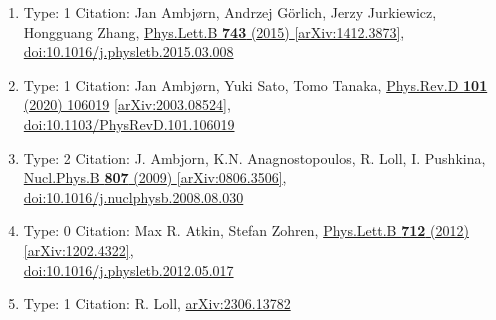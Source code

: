 \documentclass[a4paper,10pt]{article}
\begin{document}
\begin{enumerate}
\begin{enumerate}
  \item Type: 1 Citation: Jan Ambjørn, Andrzej Görlich, Jerzy Jurkiewicz, Hongguang Zhang, \href{https://www.doi.org/10.1016/j.physletb.2015.03.008}{Phys.Lett.B {\bf 743} (2015) }  \href{https://arxiv.org/abs/1412.3873}{[arXiv:1412.3873]},\\\href{https://www.doi.org/10.1016/j.physletb.2015.03.008}{doi:10.1016/j.physletb.2015.03.008}
  \item Type: 1 Citation: Jan Ambjørn, Yuki Sato, Tomo Tanaka, \href{https://www.doi.org/10.1103/PhysRevD.101.106019}{Phys.Rev.D {\bf 101} (2020) 106019}  \href{https://arxiv.org/abs/2003.08524}{[arXiv:2003.08524]},\\\href{https://www.doi.org/10.1103/PhysRevD.101.106019}{doi:10.1103/PhysRevD.101.106019}
  \item Type: 2 Citation: J. Ambjorn, K.N. Anagnostopoulos, R. Loll, I. Pushkina, \href{https://www.doi.org/10.1016/j.nuclphysb.2008.08.030}{Nucl.Phys.B {\bf 807} (2009) }  \href{https://arxiv.org/abs/0806.3506}{[arXiv:0806.3506]},\\\href{https://www.doi.org/10.1016/j.nuclphysb.2008.08.030}{doi:10.1016/j.nuclphysb.2008.08.030}
  \item Type: 0 Citation: Max R. Atkin, Stefan Zohren, \href{https://www.doi.org/10.1016/j.physletb.2012.05.017}{Phys.Lett.B {\bf 712} (2012) }  \href{https://arxiv.org/abs/1202.4322}{[arXiv:1202.4322]},\\\href{https://www.doi.org/10.1016/j.physletb.2012.05.017}{doi:10.1016/j.physletb.2012.05.017}
  \item Type: 1 Citation: R. Loll, \href{https://arxiv.org/abs/2306.13782}{arXiv:2306.13782}

\end{enumerate}
\end{enumerate}
\end{document}
